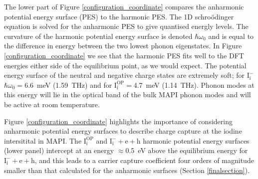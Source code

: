 The lower part of Figure \ref{configuration_coordinate} compares the anharmonic potential energy surface (PES) to the harmonic PES. The 1D schro\"{o}dinger equation is solved for the anharmonic PES to give quantised energly levels. The curvature of the harmonic potential energy surface is denoted $\hbar\omega_0$ and is equal to the difference in energy between the two lowest phonon eigenstates. In Figure \ref{configuration_coordinate} we see that the harmonic PES fits well to the DFT energies either side of the equilibrium point, as we would expect. The potential energy surface of the neutral and negative charge states are extremely soft; for $\mathrm{I}_\mathrm{i}^-$ $\hbar\omega_0=$\SI{6.6}{meV} (\SI{1.59}{\tera\hertz}) and for $\mathrm{I}_\mathrm{i}^\mathrm{OP}=$\SI{4.7}{meV} (\SI{1.14}{\tera\hertz}). Phonon modes at this energy will lie in the optical band of the bulk MAPI phonon modes and will be active at room temperature.

Figure \ref{configuration_coordinate} highlights the importance of considering anharmonic potential energy surfaces to describe charge capture at the iodine intersitital in MAPI. The $\mathrm{I}_\mathrm{i}^\mathrm{OP}$ and $\mathrm{I}_\mathrm{i}^-+\textrm{e}+\textrm{h}$ harmonic potential energy surfaces (lower panel) intercept at an energy $\approx$\SI{0.5}{eV} above the equilibrium energy for $\mathrm{I}_\mathrm{i}^-+\textrm{e}+\textrm{h}$, and this leads to a carrier capture coefficient four orders of magnitude smaller than that calculated for the anharmonic surfaces (Section \ref{finalsection}).

